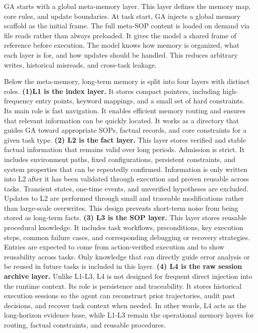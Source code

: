 GA starts with a global meta-memory layer.  
This layer defines the memory map, core rules, and update boundaries.  
At task start, GA injects a global memory scaffold as the initial frame.  
The full meta-SOP content is loaded on demand via file reads rather than always preloaded.
It gives the model a shared frame of reference before execution.  
The model knows how memory is organized, what each layer is for, and how updates should be handled.  
This reduces arbitrary writes, historical misreads, and cross-task leakage.

Below the meta-memory, long-term memory is split into four layers with distinct roles.
\textbf{(1)L1 is the index layer.} 
It stores compact pointers, including high-frequency entry points, keyword mappings, and a small set of hard constraints.  
Its main role is fast navigation. It enables efficient memory routing and ensures that relevant information can be quickly located. It works as a directory that guides GA toward appropriate SOPs, factual records, and core constraints for a given task type.
\textbf{(2) L2 is the fact layer.}
This layer stores verified and stable factual information that remains valid over long periods.
Admission is strict.
It includes environment paths, fixed configurations, persistent constraints, and system properties that can be repeatedly confirmed.
Information is only written into L2 after it has been validated through execution and proven reusable across tasks.
Transient states, one-time events, and unverified hypotheses are excluded.
Updates to L2 are performed through small and traceable modifications rather than large-scale overwrites.
This design prevents short-term noise from being stored as long-term facts.
\textbf{(3) L3 is the SOP layer.}
This layer stores reusable procedural knowledge.
It includes task workflows, preconditions, key execution steps, common failure cases, and corresponding debugging or recovery strategies.
Entries are expected to come from action-verified execution and to show reusability across tasks.
Only knowledge that can directly guide error analysis or be reused in future tasks is included in this layer.
\textbf{(4) L4 is the raw session archive layer.}  Unlike L1-L3, L4 is not designed for frequent direct injection into the runtime context.
Its role is persistence and traceability. It stores historical execution sessions so the agent can reconstruct prior trajectories, audit past decisions, and recover task context when needed.
In other words, L4 acts as the long-horizon evidence base, while L1-L3 remain the operational memory layers for routing, factual constraints, and reusable procedures.

